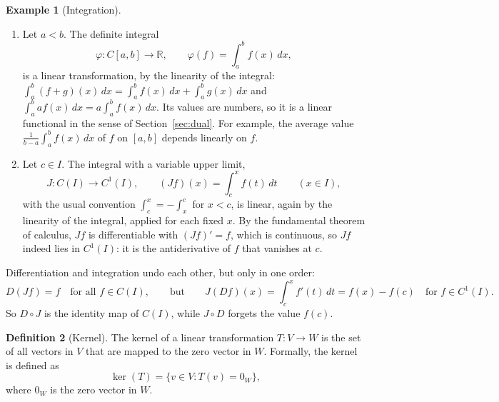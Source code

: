 \documentclass[11pt]{article}
\theoremstyle{definition}
\newtheorem{definition}{Definition}[section]
\newtheorem{example}[definition]{Example}
\theoremstyle{plain}
\theoremstyle{remark}
\begin{document}
\begin{example}[Integration]\label{ex:integration}
    \begin{enumerate}
        \item Let $a < b$. The definite integral
        \[\varphi: C[a, b] \to \mathbb{R}, \qquad \varphi(f) = \int_a^b f(x)\, dx,\]
        is a linear transformation, by the linearity of the integral: $\int_a^b (f + g)(x)\, dx = \int_a^b f(x)\, dx + \int_a^b g(x)\, dx$ and $\int_a^b af(x)\, dx = a\int_a^b f(x)\, dx$. Its values are numbers, so it is a linear functional in the sense of Section~\ref{sec:dual}. For example, the average value $\frac{1}{b - a}\int_a^b f(x)\, dx$ of $f$ on $[a, b]$ depends linearly on $f$.
        \item Let $c \in I$. The integral with a variable upper limit,
        \[J: C(I) \to C^1(I), \qquad (Jf)(x) = \int_c^x f(t)\, dt \qquad (x \in I),\]
        with the usual convention $\int_c^x = -\int_x^c$ for $x < c$, is linear, again by the linearity of the integral, applied for each fixed $x$. By the fundamental theorem of calculus, $Jf$ is differentiable with $(Jf)' = f$, which is continuous, so $Jf$ indeed lies in $C^1(I)$: it is the antiderivative of $f$ that vanishes at $c$.
    \end{enumerate}
\end{example}

Differentiation and integration undo each other, but only in one order:
\[D(Jf) = f \quad \text{for all } f \in C(I), \qquad \text{but} \qquad J(Df)(x) = \int_c^x f'(t)\, dt = f(x) - f(c) \quad \text{for } f \in C^1(I).\]
So $D \circ J$ is the identity map of $C(I)$, while $J \circ D$ forgets the value $f(c)$.

\begin{definition}[Kernel]
    The kernel of a linear transformation $T: V \to W$ is the set of all vectors in $V$ that are mapped to the zero vector in $W$. Formally, the kernel is defined as
    \[\ker(T) = \{v \in V : T(v) = 0_W\},\]
    where $0_W$ is the zero vector in $W$.
\end{definition}
\end{document}
